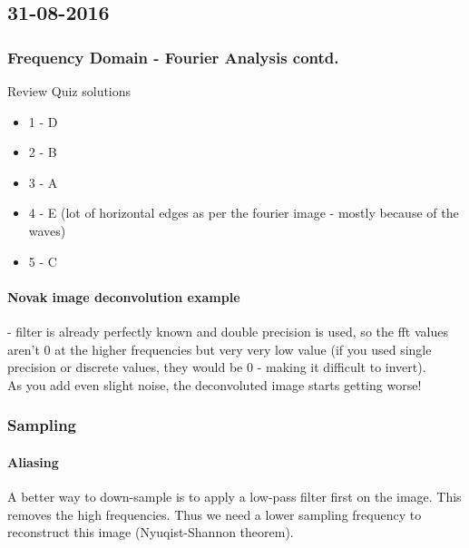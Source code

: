 \subsection{31-08-2016}
\subsubsection{Frequency Domain - Fourier Analysis contd.}
Review Quiz solutions\\
\begin{itemize}
	\item 1 - D
	\item 2 - B
	\item 3 - A
	\item 4 - E (lot of horizontal edges as per the fourier image - mostly because of the waves)
	\item 5 - C
\end{itemize}
\paragraph {Novak image deconvolution example} - filter is already perfectly known and double precision is used, so the fft values aren't 0 at the higher frequencies but very very low value (if you used single precision or discrete values, they would be 0 - making it difficult to invert).\\
As you add even slight noise, the deconvoluted image starts getting worse!

\subsubsection{Sampling}
\paragraph{Aliasing} A better way to down-sample is to apply a low-pass filter first on the image. This removes the high frequencies. Thus we need a lower sampling frequency to reconstruct this image (Nyuqist-Shannon theorem). 